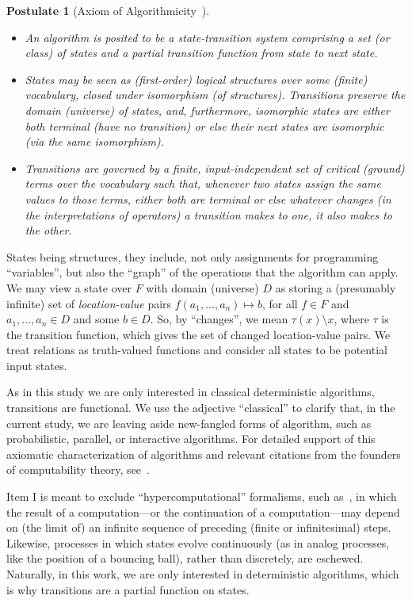 \documentclass[submission,copyright,creativecommons,english]{eptcs}
\newtheorem{postulate}{Postulate}
\newcommand{\F}{{F}}
\begin{document}
\begin{postulate}[Axiom of Algorithmicity~\cite{ASM-Theorem-Gurevich}]\ 
\begin{itemize}
\item[\rm (I)]
An \emph{algorithm}  is posited to be a state-transition system comprising a set
(or class)
of \emph{states} and a partial \emph{transition} function 
from state to \emph{next} state.  
\item[\rm (II)]
States may be seen as (first-order) logical structures
over some (finite) vocabulary, closed under isomorphism (of structures). 
Transitions preserve the domain (universe) of states, and, furthermore,
isomorphic states are either both 
terminal (have no transition) or else their next states are isomorphic (via
the same isomorphism). 
\item[\rm (III)]
Transitions are governed by a finite, input-independent set of  \emph{critical} (ground) terms over the vocabulary
such that,
whenever two states assign the same values to those terms, either both are
terminal  or else whatever changes (in the interpretations of operators) a transition makes to one,
it also makes to the other. 
\end{itemize}
\end{postulate}

States being structures, they include, not only assignments for programming ``variables'', but also the ``graph'' of the operations
 that the algorithm can apply.
We may view a state over $\F$ with domain (universe) $D$
as storing a (presumably infinite) set of \emph{location-value} pairs $f(a_{1},\ldots,a_{n})\mapsto b$,
for all $f\in\F$ and $a_{1},\ldots,a_{n}\in D$ and some $b\in D$. 
So, by ``changes'', we mean $\tau(x)\setminus x$, where $\tau$ is the transition function, which gives the set of changed location-value pairs.
We  treat relations as truth-valued functions and consider all states to be
potential input states.

As in this study we are only interested in classical deterministic algorithms, transitions are functional.
We use the adjective {}``classical'' to clarify that, in the current
study, we are leaving aside new-fangled forms of algorithm, such as
probabilistic, parallel, or interactive algorithms.
For detailed support of this axiomatic characterization of algorithms
and relevant citations from the founders of computability theory,
see~\cite{ASM-Theorem-Gurevich,BSL}.

Item I is meant to exclude ``hypercomputational''  formalisms, such as~\cite{Gold,Putnam}, 
in which the result of a computation---or the continuation of a computation---may depend
on (the limit of) an infinite sequence of preceding (finite or infinitesimal) steps.
Likewise,
processes in which states evolve continuously (as in analog processes, like the position of a bouncing ball), rather than discretely, are eschewed.
Naturally, in this work, we are only interested in deterministic algorithms, which is why transitions are a partial function on states.
\end{document}
